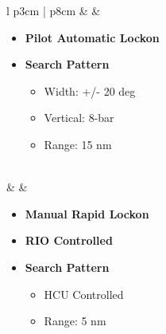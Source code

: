 \documentclass[8pt,usenames,dvipsnames,twoside]{article}
\begin{document}
\begin{center}
\begin{longtable}{l p{3cm} | p{8cm}}
				\midrule
				\textbullet &  &  
				\begin{minipage}[t]{\linewidth}
					\vspace{-7pt}
					\begin{itemize}
						\item \textbf{Pilot Automatic Lockon}
						\item \textbf{Search Pattern}
						\begin{itemize}
							\item Width: +/- 20 deg
							\item Vertical: 8-bar
							\item Range: 15 nm
						\end{itemize}
					\end{itemize}
				\end{minipage} \\
				\midrule
				\textbullet &  &  
				\begin{minipage}[t]{\linewidth}
					\vspace{-7pt}
					\begin{itemize}
						\item \textbf{Manual Rapid Lockon}
						\item \textbf{RIO Controlled}
						\item \textbf{Search Pattern}
						\begin{itemize}
							\item HCU Controlled
							\item Range: 5 nm
						\end{itemize}
					\end{itemize}
				\end{minipage} \\
				\bottomrule
			\end{longtable}
		\end{center}
	
		
\end{document}
